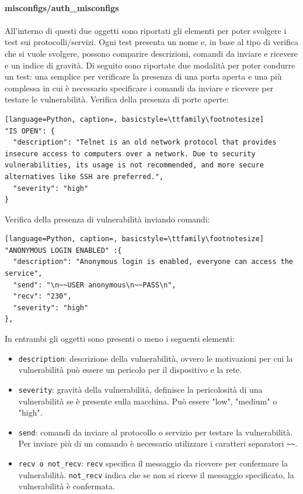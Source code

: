 \documentclass[12pt]{report}
\begin{document}
\noindent
\\
\textbf{misconfigs/auth\_misconfigs}
\\\\
All'interno di questi due oggetti sono riportati gli elementi per poter svolgere i test sui protocolli/servizi. Ogni test presenta un nome e, in base al tipo di verifica che si vuole svolgere, possono comparire descrizioni, comandi da inviare e ricevere e un indice di gravità. Di seguito sono riportate due modalità per poter condurre un test: una semplice per verificare la presenza di una porta aperta e una più complessa in cui è necessario specificare i comandi da inviare e ricevere per testare le vulnerabilità.
\newpage
\noindent
Verifica della presenza di porte aperte:
\begin{lstlisting}[language=Python, caption=, basicstyle=\ttfamily\footnotesize]
"IS OPEN": {
  "description": "Telnet is an old network protocol that provides insecure access to computers over a network. Due to security vulnerabilities, its usage is not recommended, and more secure alternatives like SSH are preferred.",
  "severity": "high"
}
\end{lstlisting}
Verifica della presenza di vulnerabilità inviando comandi:
\begin{lstlisting}[language=Python, caption=, basicstyle=\ttfamily\footnotesize]
"ANONYMOUS LOGIN ENABLED" :{
  "description": "Anonymous login is enabled, everyone can access the service",
  "send": "\n~~USER anonymous\n~~PASS\n",
  "recv": "230",
  "severity": "high"
},
\end{lstlisting}
In entrambi gli oggetti sono presenti o meno i seguenti elementi:
\begin{itemize}
    \item \lstinline{description}: descrizione della vulnerabilità, ovvero le motivazioni per cui la vulnerabilità può essere un pericolo per il dispositivo e la rete.
    \item \lstinline{severity}: gravità della vulnerabilità, definisce la pericolosità di una vulnerabilità se è presente sulla macchina. Può essere "low", "medium" o "high".
    \item \lstinline{send}: comandi da inviare al protocollo o servizio per testare la vulnerabilità. Per inviare più di un comando è necessario utilizzare i caratteri separatori \lstinline{~~}.
    \item \lstinline{recv o not_recv}: \lstinline{recv} specifica il messaggio da ricevere per confermare la vulnerabilità. \lstinline{not_recv} indica che se non si riceve il messaggio specificato, la vulnerabilità è confermata.
\end{itemize}
\end{document}
